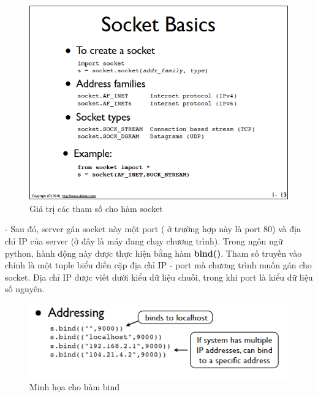\documentclass[14pt]{extreport}
\begin{document}
\begin{center}
    \begin{figure}[H]
    \begin{center}
     \includegraphics[scale=.8]{gia tri tham so cho ham socket.PNG}
    \end{center}
    \caption{Giá trị các tham số cho hàm socket \cite{2}}
    \label{refhinh3}
    \end{figure}
\end{center}

- Sau đó, server gán socket này một port ( ở trường hợp này là port 80) và địa chỉ IP của server (ở đây là máy đang chạy chương trình). Trong ngôn ngữ python, hành động này được thực hiện bằng hàm {\bf bind()}. Tham số truyền vào chính là một tuple biểu diễn cặp địa chỉ IP - port mà chương trình muốn gán cho socket. Địa chỉ IP được viết dưới kiểu dữ liệu chuỗi, trong khi port là kiểu dữ liệu số nguyên.

\begin{center}
    \begin{figure}[H]
    \begin{center}
     \includegraphics[scale=.8]{lenh bind.PNG}
    \end{center}
    \caption{Minh họa cho hàm bind \cite{2}}
    \end{figure}
\end{center}
\end{document}
